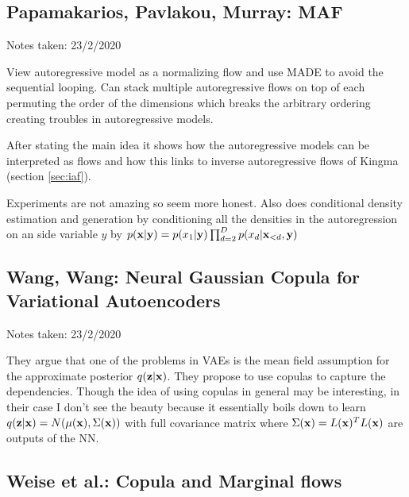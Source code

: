 \subsection{Papamakarios, Pavlakou, Murray: MAF}

\begin{notebox}

\hfill Notes taken: 23/2/2020 
\end{notebox}

View autoregressive model as a normalizing flow and use MADE to avoid the sequential looping. Can stack multiple autoregressive flows on top of each permuting the order of the dimensions which breaks the arbitrary ordering creating troubles in autoregressive models.

After stating the main idea it shows how the autoregressive models can be interpreted as flows and how this links to inverse autoregressive flows of Kingma (section \ref{sec:iaf}).

Experiments are not amazing so seem more honest. Also does conditional density estimation and generation by conditioning all the densities in the autoregression on an side variable $y$ by $p(\mathbf{x} | \mathbf{y}) = p(x_1 | \mathbf{y}) \prod_{d=2}^D p(x_d \vert \mathbf{x}_{<d}, \mathbf{y})$


\subsection{Wang, Wang: Neural Gaussian Copula for Variational Autoencoders}

\begin{notebox}

\hfill Notes taken: 23/2/2020 
\end{notebox}

They argue that one of the problems in VAEs is the mean field assumption for the approximate posterior $q(\mathbf{z} | \mathbf{x})$. They propose to use copulas to capture the dependencies. Though the idea of using copulas in general may be interesting, in their case I don't see the beauty because it essentially boils down to learn $q(\mathbf{z} | \mathbf{x}) = N(\mu(\mathbf{x}), \Sigma(\mathbf{x}))$ with full covariance matrix where $\Sigma(\mathbf{x}) = L(\mathbf{x})^T L(\mathbf{x})$ are outputs of the NN.


\subsection{Weise et al.: Copula and Marginal flows}

